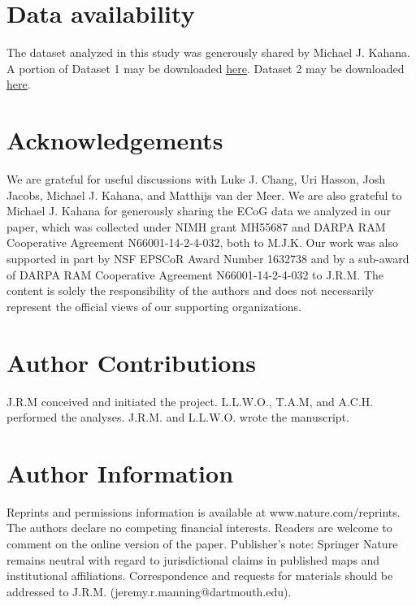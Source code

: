 \documentclass[11pt]{article}
\begin{document}
\section*{Data availability}
The dataset analyzed in this study was generously shared by Michael
J. Kahana.  A portion of Dataset 1 may be downloaded
\href{http://memory.psych.upenn.edu/Request_EEG_access?paper=SedeEtal03}{\underline{here}}.
Dataset 2 may be downloaded
\href{http://memory.psych.upenn.edu/Request_EEG_access?paper=EzzyEtal17}{\underline{here}}.

\section*{Acknowledgements}
We are grateful for useful discussions with Luke J. Chang, Uri Hasson,
Josh Jacobs, Michael J. Kahana, and Matthijs van der Meer.  We are
also grateful to Michael J. Kahana for generously sharing the ECoG
data we analyzed in our paper, which was collected under NIMH grant
MH55687 and DARPA RAM Cooperative Agreement N66001-14-2-4-032, both to
M.J.K.  Our work was also supported in part by NSF EPSCoR Award Number
1632738 and by a sub-award of DARPA RAM Cooperative Agreement
N66001-14-2-4-032 to J.R.M.  The content is solely the responsibility
of the authors and does not necessarily represent the official views
of our supporting organizations.

\section*{Author Contributions}
J.R.M conceived and initiated the project. L.L.W.O., T.A.M, and
A.C.H. performed the analyses. J.R.M. and L.L.W.O. wrote the
manuscript.

\section*{Author Information}
Reprints and permissions information is available at www.nature.com/reprints.  The authors declare no competing financial interests.  Readers are welcome to comment on the online version of the paper.  Publisher's note: Springer Nature remains neutral with regard to jurisdictional claims in published maps and institutional affiliations.  Correspondence and requests for materials should be addressed to J.R.M. (jeremy.r.manning@dartmouth.edu).




\clearpage
\end{document}
